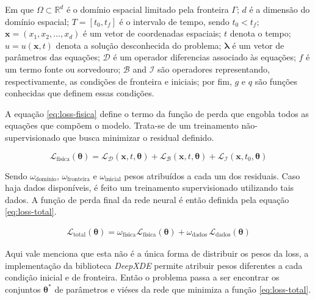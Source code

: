 Em que $\Omega \subset \mathbb{R}^d$ é o domínio espacial limitado pela 
fronteira $\Gamma$; 
$d$ é a dimensão do domínio espacial; 
$T = [t_0, t_f]$ é o intervalo de tempo, sendo $t_0 < t_f$; 
$\boldsymbol{x} = (x_1, x_2, \dots, x_d)$ é um vetor de coordenadas espaciais; 
$t$ denota o tempo; 
$u = u(\boldsymbol{x}, t)$ denota a solução desconhecida do problema; 
$\boldsymbol{\lambda}$ é um vetor de parâmetros das equações; 
$\mathcal{D}$ é um operador diferencias associado às equações; 
$f$ é um termo fonte ou sorvedouro; 
$\mathcal{B}$ and $\mathcal{I}$ são operadores representando, respectivamente,
as condições de fronteira e iniciais; 
por fim, $g$ e $q$ são funções conhecidas que definem essas condições.

A equação \ref{eq:loss-fisica} define o termo da função de perda que engobla
todos as equações que compõem o modelo. Trata-se de um treinamento 
não-supervisionado que busca minimizar o residual definido.

\begin{equation}\label{eq:loss-fisica}
    \mathcal{L}_{\text{física}}(\boldsymbol{\theta}) 
    = \mathcal{L}_{\mathcal{D}}(\boldsymbol{x},t,\boldsymbol{\theta}) 
    + \mathcal{L}_{\mathcal{B}}(\boldsymbol{x},t,\boldsymbol{\theta}) 
    + \mathcal{L}_{\mathcal{I}}(\boldsymbol{x},t_0,\boldsymbol{\theta}) 
\end{equation}

Sendo $\omega_{\text{domínio}}$, $\omega_{\text{fronteira}}$ 
e $\omega_{\text{inicial}}$ pesos atribuídos a cada um dos residuais.
Caso haja dados disponíveis, é feito um treinamento supervisionado utilizando 
tais dados. A função de perda final da rede neural é então definida pela equação
\ref{eq:loss-total}.

\begin{eqnarray}\label{eq:loss-total} 
    \mathcal{L}_{\text{total}}(\boldsymbol{\theta}) 
    = \omega_{\text{física}} \mathcal{L}_{\text{física}}(\boldsymbol{\theta}) 
    + \omega_{\text{dados}} \,\mathcal{L}_{\text{dados}}(\boldsymbol{\theta})
\end{eqnarray}

Aqui vale menciona que esta não é a única forma de distribuir os pesos da loss,
a implementação da biblioteca \textit{DeepXDE} \cite{lu-etal:21-deepxde}
permite atribuir pesos diferentes a cada condição inicial e de fronteira. 
Então o problema passa a ser encontrar os conjuntos $\boldsymbol{\theta}^*$ de 
parâmetros e viéses da rede que minimiza a função \ref{eq:loss-total}.

